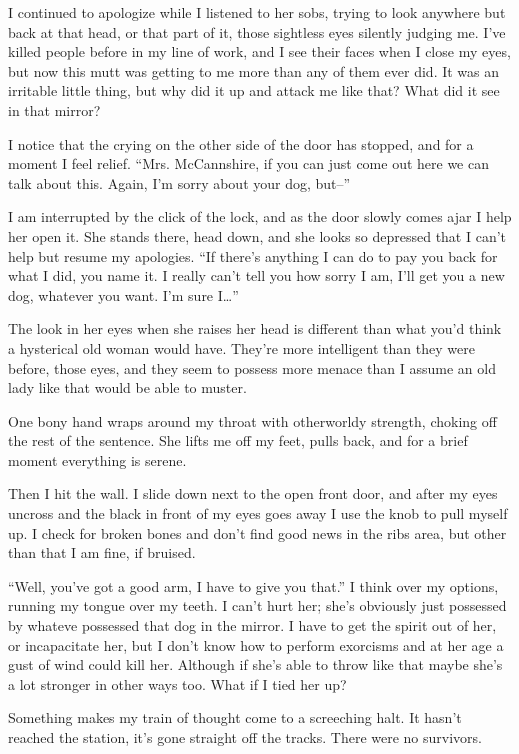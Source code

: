 I continued to apologize while I listened to her sobs, trying to look
anywhere but back at that head, or that part of it, those sightless eyes
silently judging me. I've killed people before in my line of work, and I
see their faces when I close my eyes, but now this mutt was getting to
me more than any of them ever did. It was an irritable little thing, but
why did it up and attack me like that? What did it see in that mirror?

I notice that the crying on the other side of the door has stopped, and
for a moment I feel relief. ``Mrs. McCannshire, if you can just come out
here we can talk about this. Again, I'm sorry about your dog, but--''

I am interrupted by the click of the lock, and as the door slowly comes
ajar I help her open it. She stands there, head down, and she looks so
depressed that I can't help but resume my apologies. ``If there's
anything I can do to pay you back for what I did, you name it. I really
can't tell you how sorry I am, I'll get you a new dog, whatever you
want. I'm sure I\ldots{}''

The look in her eyes when she raises her head is different than what
you'd think a hysterical old woman would have. They're more intelligent
than they were before, those eyes, and they seem to possess more menace
than I assume an old lady like that would be able to muster.

One bony hand wraps around my throat with otherworldy strength, choking
off the rest of the sentence. She lifts me off my feet, pulls back, and
for a brief moment everything is serene.

Then I hit the wall. I slide down next to the open front door, and after
my eyes uncross and the black in front of my eyes goes away I use the
knob to pull myself up. I check for broken bones and don't find good
news in the ribs area, but other than that I am fine, if bruised.

``Well, you've got a good arm, I have to give you that.'' I think over my
options, running my tongue over my teeth. I can't hurt her; she's
obviously just possessed by whateve possessed that dog in the mirror. I
have to get the spirit out of her, or incapacitate her, but I don't know
how to perform exorcisms and at her age a gust of wind could kill
her. Although if she's able to throw like that maybe she's a lot
stronger in other ways too. What if I tied her up?

Something makes my train of thought come to a screeching halt. It hasn't
reached the station, it's gone straight off the tracks. There were no
survivors.

